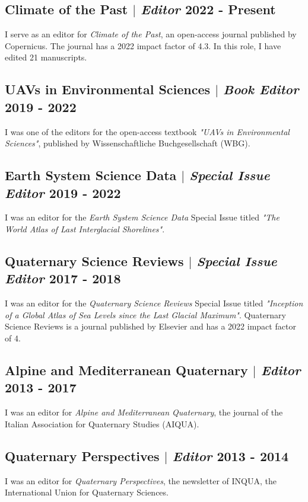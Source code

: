 \documentclass[11pt]{article}
\begin{document}
\subsection{Climate of the Past $|$ {\normalfont\textit{Editor}} \hfill 2022 - Present}
{\footnotesize I serve as an editor for \textit{Climate of the Past}, an open-access journal published by Copernicus. The journal has a 2022 impact factor of 4.3. In this role, I have edited 21 manuscripts.}
\bigskip

\subsection{UAVs in Environmental Sciences $|$ {\normalfont\textit{Book Editor}} \hfill 2019 - 2022}
{\footnotesize I was one of the editors for the open-access textbook \textit{"UAVs in Environmental Sciences"}, published by Wissenschaftliche Buchgesellschaft (WBG).}
\bigskip

\subsection{Earth System Science Data $|$ {\normalfont\textit{Special Issue Editor}} \hfill 2019 - 2022}
{\footnotesize I was an editor for the \textit{Earth System Science Data} Special Issue titled \textit{"The World Atlas of Last Interglacial Shorelines"}.}
\bigskip

\subsection{Quaternary Science Reviews $|$ {\normalfont\textit{Special Issue Editor}} \hfill 2017 - 2018}
{\footnotesize I was an editor for the \textit{Quaternary Science Reviews} Special Issue titled \textit{"Inception of a Global Atlas of Sea Levels since the Last Glacial Maximum"}. Quaternary Science Reviews is a journal published by Elsevier and has a 2022 impact factor of 4.}
\bigskip

\subsection{Alpine and Mediterranean Quaternary $|$ {\normalfont\textit{Editor}} \hfill 2013 - 2017}
{\footnotesize I was an editor for \textit{Alpine and Mediterranean Quaternary}, the journal of the Italian Association for Quaternary Studies (AIQUA).}
\bigskip

\subsection{Quaternary Perspectives $|$ {\normalfont\textit{Editor}} \hfill 2013 - 2014}
{\footnotesize I was an editor for \textit{Quaternary Perspectives}, the newsletter of INQUA, the International Union for Quaternary Sciences.}
\end{document}
